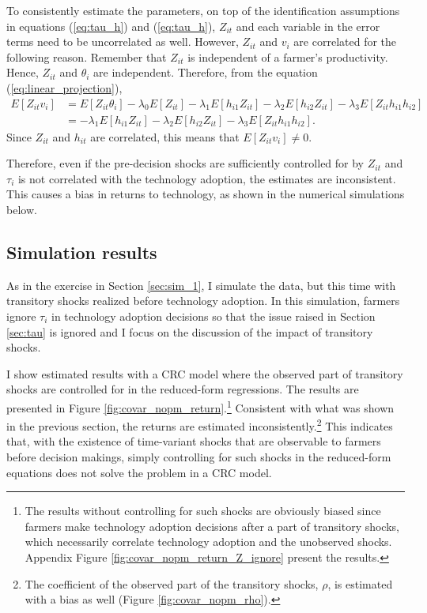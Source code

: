 \documentclass[11pt,letterpaper]{article}
\begin{document}
To consistently estimate the parameters, on top of the identification assumptions in equations (\ref{eq:tau_h}) and (\ref{eq:tau_h}), $Z_{it}$ and each variable in the error terms need to be uncorrelated as well.
However, $Z_{it}$ and $v_i$ are correlated for the following reason.
Remember that $Z_{it}$ is independent of a farmer's productivity.
Hence, $Z_{it}$ and $\theta_i$ are independent.
Therefore, from the equation (\ref{eq:linear_projection}), 
\begin{align*}
  E[Z_{it} v_i] 
  &= E[Z_{it} \theta_i] - \lambda_0 E[Z_{it}] - \lambda_1 E[h_{i1} Z_{it}] - \lambda_2 E[h_{i2} Z_{it}] - \lambda_3 E[Z_{it} h_{i1} h_{i2}] \\
  &=  - \lambda_1 E[h_{i1} Z_{it}] - \lambda_2 E[h_{i2} Z_{it}] - \lambda_3 E[Z_{it} h_{i1} h_{i2}].
\end{align*}
Since $Z_{it}$ and $h_{it}$ are correlated, this means that $E[Z_{it} v_i] \ne 0$.

Therefore, even if the pre-decision shocks are sufficiently controlled for by $Z_{it}$ and $\tau_i$ is not correlated with the technology adoption, the estimates are inconsistent.
This causes a bias in returns to technology, as shown in the numerical simulations below.

\subsection{Simulation results}

As in the exercise in Section \ref{sec:sim_1}, I simulate the data, but this time with transitory shocks realized before technology adoption.
In this simulation, farmers ignore $\tau_i$ in technology adoption decisions so that the issue raised in Section \ref{sec:tau} is ignored and I focus on the discussion of the impact of transitory shocks.

I show estimated results with a CRC model where the observed part of transitory shocks are controlled for in the reduced-form regressions.
The results are presented in Figure \ref{fig:covar_nopm_return}.\footnote{
  The results without controlling for such shocks are obviously biased since farmers make technology adoption decisions after a part of transitory shocks, which necessarily correlate technology adoption and the unobserved shocks. 
  Appendix Figure \ref{fig:covar_nopm_return_Z_ignore} present the results.
}
Consistent with what was shown in the previous section, the returns are estimated inconsistently.\footnote{
  The coefficient of the observed part of the transitory shocks, $\rho$, is estimated with a bias as well (Figure \ref{fig:covar_nopm_rho}).
}
This indicates that, with the existence of time-variant shocks that are observable to farmers before decision makings, simply controlling for such shocks in the reduced-form equations does not solve the problem in a CRC model.
\end{document}
